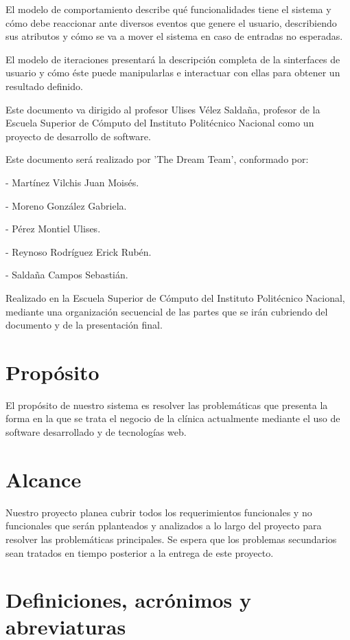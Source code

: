 El modelo de comportamiento describe qué funcionalidades tiene el sistema y cómo debe reaccionar ante diversos eventos que genere el usuario, describiendo sus atributos y cómo se va a mover el sistema en caso de entradas no esperadas.

El modelo de iteraciones presentará la descripción completa de la sinterfaces de usuario y cómo éste puede manipularlas e interactuar con ellas para obtener un resultado definido.

Este documento va dirigido al profesor Ulises Vélez Saldaña, profesor de la Escuela Superior de Cómputo del Instituto Politécnico Nacional como un proyecto de desarrollo de software.

Este documento será realizado por 'The Dream Team', conformado por:

- Martínez Vilchis Juan Moisés.

- Moreno González Gabriela.

- Pérez Montiel Ulises.

- Reynoso Rodríguez Erick Rubén.

- Saldaña Campos Sebastián.

Realizado en la Escuela Superior de Cómputo del Instituto Politécnico Nacional, mediante una organización secuencial de las partes que se irán cubriendo del documento y de la presentación final.

\section{Propósito}
El propósito de nuestro sistema es resolver las problemáticas que presenta la forma en la que se trata el negocio de la clínica actualmente mediante el uso de software desarrollado y de tecnologías web.

\section{Alcance}
Nuestro proyecto planea cubrir todos los requerimientos funcionales y no funcionales que serán pplanteados y analizados a lo largo del proyecto para resolver las problemáticas principales. Se espera que los problemas secundarios sean tratados en tiempo posterior a la entrega de este proyecto.

\section{Definiciones, acrónimos y abreviaturas}

